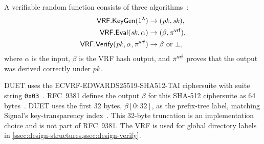 \begin{definition}\label{def:vrf}
A verifiable random function consists of three algorithms~\cite[Section~2]{rfc9381}:
\[
\begin{aligned}
  \mathsf{VRF.KeyGen}(1^\lambda) &\to (\mathit{pk},\mathit{sk}), \\
  \mathsf{VRF.Eval}(\mathit{sk},\alpha) &\to (\beta,\pi^{\mathsf{vrf}}), \\
  \mathsf{VRF.Verify}(\mathit{pk},\alpha,\pi^{\mathsf{vrf}}) &\to \beta \ \text{or}\ \bot,
\end{aligned}
\]
where $\alpha$ is the input, $\beta$ is the VRF hash output, and $\pi^{\mathsf{vrf}}$ proves that the output was
derived correctly under $\mathit{pk}$.

DUET uses the ECVRF-EDWARDS25519-SHA512-TAI ciphersuite with suite string
\texttt{0x03}~\cite[Section~5.5]{rfc9381}. RFC~9381 defines the output $\beta$ for this SHA-512
ciphersuite as 64 bytes~\cite[Sections~5.2 and~5.5]{rfc9381}. DUET uses the first 32 bytes,
$\beta[0{:}32]$, as the prefix-tree label, matching Signal's key-transparency
index~\cite{signal-kt-server}. This 32-byte truncation is an implementation choice and is not part
of RFC~9381. The VRF is used for global directory labels in
\cref{ssec:design-structures,ssec:design-verify}.
\end{definition}

